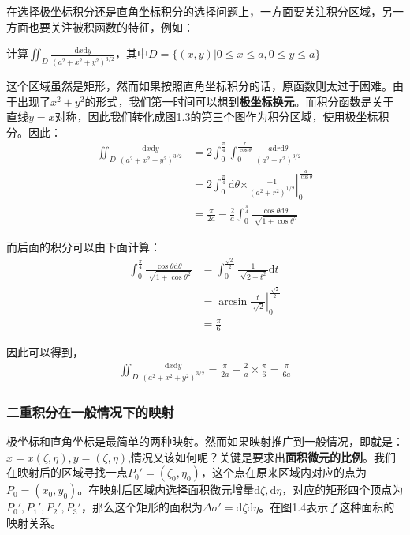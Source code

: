 \documentclass{ctexart}
\let\oldtextbf\textbf
\renewcommand{\textbf}[1]{\textcolor{brown!50!red}{\oldtextbf{#1}}}
\begin{document}
在选择极坐标积分还是直角坐标积分的选择问题上，一方面要关注积分区域，另一方面也要关注被积函数的特征，例如：

计算$\iint_D \frac{\mathrm{d}x\mathrm{d}y}{(a^2+x^2+y^2)^{3/2}}$，其中$D=\{(x,y)|0\leq x\leq a,0\leq y\leq a\} $

这个区域虽然是矩形，然而如果按照直角坐标积分的话，原函数则太过于困难。由于出现了$x^2+y^2$的形式，我们第一时间可以想到\textbf{\color{brown!50!red}极坐标换元}。而积分函数是关于直线$y=x$对称，因此我们转化成图1.3的第三个图作为积分区域，使用极坐标积分。因此：
\begin{align*}
\iint_D\frac{\mathrm{d}x\mathrm{d}y  }{(a^2+x^2+y^2)^{3/2}}&=2\int_0^{\frac{\pi}{4} }\int_0^
{\frac{r}{\cos\theta} }\frac{a\mathrm{d}r\mathrm{d}\theta }{(a^2+r^2)^{3/2}} \\
&=2\int_0^{\frac{\pi}{4}}\mathrm{d}\theta \left.\times \frac{-1}{(a^2+r^2)^{1/2}} \right|_0^
{\frac{a}{\cos\theta}}\\
 &=\frac{\pi}{2a}-\frac{2}{a}\int_0^\frac{\pi}{4}\frac{\cos\theta\mathrm{d}\theta }
{\sqrt[]{1+\cos\theta^2} }     
\end{align*} 

而后面的积分可以由下面计算：
\begin{align*}
  \int_0^\frac{\pi}{4}\frac{\cos\theta\mathrm{d}\theta }
{\sqrt[]{1+\cos\theta^2} }     &=\int_0^{\frac{\sqrt{2}}{2}}\frac{1}{\sqrt[]{2-t^2} }\mathrm{d}t\\
&=\left.\arcsin{\frac{t}{\sqrt[]{2} }} \right|_0^{\frac{\sqrt[]{2}}{2}  }  \\&=\frac{\pi}{6}  
\end{align*} 

因此可以得到，
\begin{align*}
\iint_D\frac{\mathrm{d}x\mathrm{d}y  }{(a^2+x^2+y^2)^{3/2}}=\frac{\pi}{2a}-\frac{2}{a}\times 
\frac{\pi}{6}=\frac{\pi}{6a}   
\end{align*} 

\subsubsection{二重积分在一般情况下的映射}
极坐标和直角坐标是最简单的两种映射。然而如果映射推广到一般情况，即就是：$x=x(\zeta ,\eta),y=(\zeta,\eta) $,情况又该如何呢？关键是要求出\textbf{\color{brown!50!red}面积微元的比例}。我们在映射后的区域寻找一点$P_0'=(\zeta_0,\eta_0)$，这个点在原来区域内对应的点为$P_0=(x_0,y_0)$。在映射后区域内选择面积微元增量$\mathrm{d}\zeta,\mathrm{d}\eta$，对应的矩形四个顶点为$P_0',P_1',P_2',P_3'$，那么这个矩形的面积为$\Delta \sigma'=\mathrm{d}\zeta\mathrm{d}\eta$。在图1.4表示了这种面积的映射关系。
\end{document}
